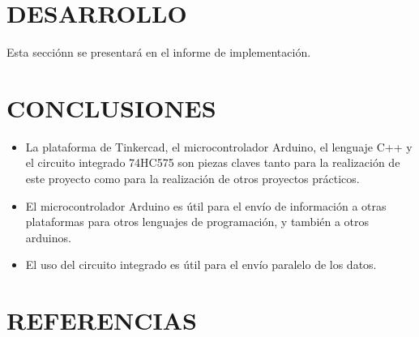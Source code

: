 \documentclass{article}
\begin{document}
\section{DESARROLLO}

Esta secciónn se presentará en el informe de implementación.\\


\section{CONCLUSIONES} \label{conclulsion}
\begin{itemize}
\item La plataforma de Tinkercad, el microcontrolador Arduino, el lenguaje C++ y el circuito integrado 74HC575 son piezas claves tanto para la realización de este proyecto como para la realización de otros proyectos prácticos.
\item El microcontrolador Arduino es útil para el envío de información a otras plataformas para otros lenguajes de programación, y también a otros arduinos.
\item El uso del circuito integrado es útil para el envío paralelo de los datos.

\end{itemize}

\section{REFERENCIAS}    




\end{document}
